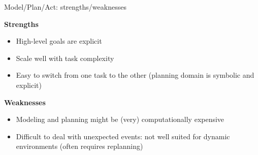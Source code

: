 \documentclass[compress]{beamer}
\begin{document}
\begin{frame}{Model/Plan/Act: strengths/weaknesses}

    {\bf Strengths}

    \begin{itemize}
        \item High-level goals are explicit
        \item Scale well with task complexity
        \item Easy to switch from one task to the other (planning domain is
            symbolic and explicit)

    \end{itemize}

    {\bf Weaknesses}

    \begin{itemize}
        \item Modeling and planning might be (very) computationally expensive
        \item Difficult to deal with unexpected events: not well suited for
            dynamic environments (often requires replanning)

    \end{itemize}

\end{frame}


\end{document}
